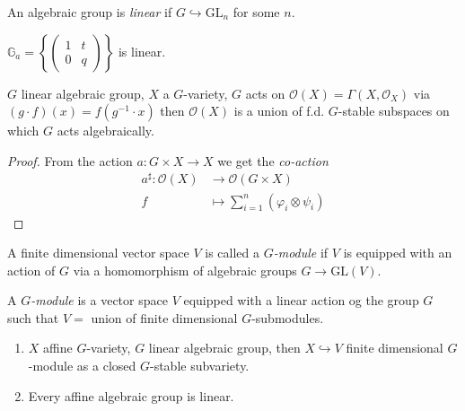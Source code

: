 \begin{definition}
\label{definition-linear-algebraic-group}
An algebraic group is {\it linear} if $G \hookrightarrow \text{GL}_n$ for some
$n$.
\end{definition}

\begin{example}
\label{example-multiplicative-group-is-linear}
$\mathbb{G}_a=\left\{\begin{pmatrix}
1&t\\ 
0&q
\end{pmatrix}\right\}$ is linear.
\end{example}

\begin{proposition}
\label{proposition-co-action}
$G$ linear algebraic group,  $X$ a $G$-variety, $G$ acts on
$\mathcal{O}(X)=\Gamma(X,\mathcal{O}_X)$ via $(g\cdot f)(x)=f(g^{-1}\cdot x)$
then $\mathcal{O}(X)$ is a union of f.d. $G$-stable subspaces on which $G$ acts
algebraically.
\end{proposition}

\begin{proof}
From the action $a:G \times X \to X$ we get the {\it co-action} 
\begin{align*}
a^\sharp: \mathcal{O}(X) &\longrightarrow \mathcal{O}(G \times X) \\
f &\longmapsto \sum_{i=1}^n(\varphi_i \otimes \psi_i)
\end{align*}
\end{proof}

\begin{definition}
\label{definition-G-module}
A finite dimensional vector space $V$ is called a {\it $G$-module} if $V$ is equipped
with an action of $G$ via a homomorphism of algebraic groups 
$G \to \text{GL}(V)$.

A  {\it $G$-module} is a vector space $V$ equipped with a linear action og the
group $G$ such that $V=$ union of finite dimensional $G$-submodules.
\end{definition}

\begin{proposition}
\label{proposition-G-modules}
 \begin{enumerate}
\item $X$ affine $G$-variety, $G$ linear algebraic group, then $X
\hookrightarrow  V$ finite dimensional $G$-module as a closed $G$-stable
subvariety.
\item Every affine algebraic group is linear.
\end{enumerate}
\end{proposition}

